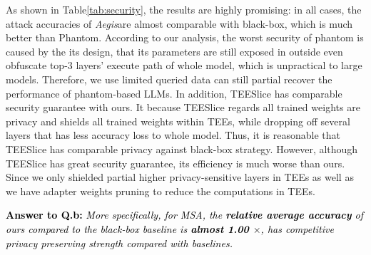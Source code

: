\documentclass{article}
\newcommand{\method}{\textit{Aegis}}
\begin{document}
As shown in Table\ref{tab:security}, the results are highly promising: in all cases, the attack accuracies of \method are almost comparable with black-box, which is much better than Phantom. According to our analysis, the worst security of phantom is caused by the its design, that its parameters are still exposed in outside even obfuscate top-3 layers' execute path of whole model, which is unpractical to large models. Therefore, we use limited queried data can still partial recover the performance of phantom-based LLMs. In addition, TEESlice has comparable security guarantee with ours. It because TEESlice regards all trained weights are privacy and shields all trained weights within TEEs, while dropping off several layers that has less accuracy loss to whole model. Thus, it is reasonable that TEESlice has comparable privacy against black-box strategy. However, although TEESlice has great security guarantee, its efficiency is much worse than ours. Since we only shielded partial higher privacy-sensitive layers in TEEs as well as we have adapter weights pruning to reduce the computations in TEEs. 
\begin{center}
    \begin{tcolorbox}[
            colframe=black,width=1\linewidth,
            arc=1mm, auto outer arc]
            \textcolor{black}{{\textbf{Answer to Q.b:} 
            \textit{More specifically, for MSA, the \textbf{relative average accuracy} of ours compared to the black-box baseline is \textbf{almost 1.00 $\times$}, has competitive privacy preserving strength compared with baselines.}}}
    \end{tcolorbox}
\end{center}
\end{document}

